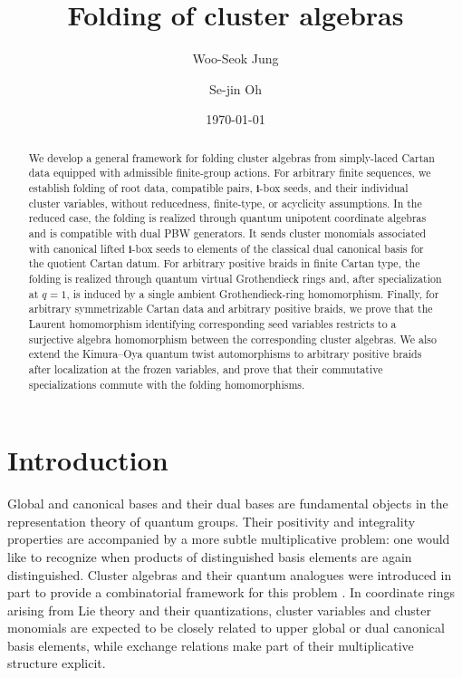\documentclass[12pt, leqno]{amsart}
\title[Folding of cluster algebras]{Folding of cluster algebras}
\author[W.-S. Jung]{Woo-Seok Jung}
\author[S.-j. Oh]{Se-jin Oh}
\date{\today}
\numberwithin{equation}{section}
\theoremstyle{plain}
\theoremstyle{definition}
\newcommand{\bfi}{\mathbf{i}}
\begin{document}
\begin{abstract}
We develop a general framework for folding cluster algebras from
simply-laced Cartan data equipped with admissible finite-group actions.
For arbitrary finite sequences, we establish folding of root data,
compatible pairs, $\bfi$-box seeds, and their individual cluster variables,
without reducedness, finite-type, or acyclicity assumptions.
In the reduced case, the folding is realized through quantum unipotent
coordinate algebras and is compatible with dual PBW generators.
It sends cluster monomials associated with canonical lifted
$\bfi$-box seeds to elements of the classical dual canonical basis
 for the quotient Cartan datum.
For arbitrary positive braids in finite Cartan type, the folding is
realized through quantum virtual Grothendieck rings and, after
specialization at $q=1$, is induced by a single ambient
Grothendieck-ring homomorphism.
Finally, for arbitrary symmetrizable Cartan data and arbitrary
positive braids, we prove that  the Laurent homomorphism identifying corresponding seed variables restricts
to a surjective algebra homomorphism between the corresponding
cluster algebras.
We also extend the Kimura--Oya quantum twist automorphisms
to arbitrary positive braids after localization at the frozen
variables, and prove that their commutative specializations
commute with the folding homomorphisms.
\end{abstract}



\maketitle
\tableofcontents

\section*{Introduction}

Global and canonical bases and their dual bases are fundamental
objects in the representation theory of quantum groups. Their
positivity and integrality properties are accompanied by a more subtle
multiplicative problem: one would like to recognize when products of
distinguished basis elements are again distinguished. Cluster algebras and their quantum analogues were introduced in part
to provide a combinatorial framework for this problem
\cite{FZ02,BZ05}. In coordinate rings arising from Lie theory and
their quantizations, cluster variables and cluster monomials are
expected to be closely related to upper global or dual canonical basis
elements, while exchange relations make part of their multiplicative
structure explicit.
\end{document}
